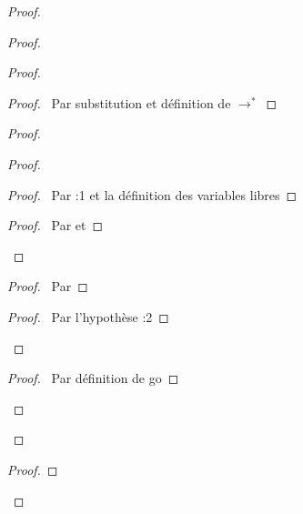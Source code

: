 \documentclass[a4paper]{article}
\begin{document}
\begin{proof}
\begin{proof}
\begin{proof}
      \begin{proof}
        \pf\ Par substitution et définition de $\to^*$
      \end{proof}
      \begin{proof}
        \begin{proof}
          \begin{proof}
            \pf\ Par :1 et la définition des variables libres
          \end{proof}
          \qedstep
          \begin{proof}
            \pf\ Par  et 
          \end{proof}
        \end{proof}
        \begin{proof}
          \pf\ Par 
        \end{proof}
        \qedstep
        \begin{proof}
          \pf\ Par l'hypothèse :2
        \end{proof}
      \end{proof}
      \begin{proof}
        \pf\ Par définition de \textsf{go}
      \end{proof}
    \end{proof}
  \end{proof}
  \begin{proof}

\end{proof}
\end{proof}
\end{document}
